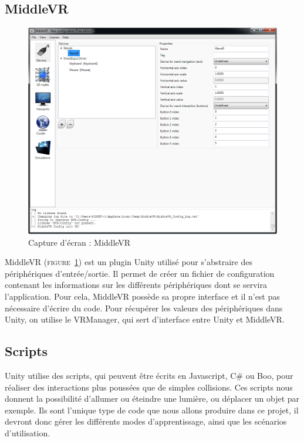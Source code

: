 \subsection{MiddleVR}
\begin{figure}[h]
  \includegraphics[width=1\textwidth]{4-Conception/img/middlevr_screenshot.png}
  \caption{Capture d'écran : MiddleVR}
  \label{middlevr}
\end{figure}
MiddleVR (\textsc{figure~\ref{middlevr}}) est un plugin Unity utilisé pour s'abstraire des périphériques d'entrée/sortie. Il permet de créer un fichier de configuration contenant les informations sur les différents périphériques dont se servira l'application. Pour cela, MiddleVR possède sa propre interface et il n'est pas nécessaire d'écrire du code.
Pour récupérer les valeurs des périphériques dans Unity, on utilise le VRManager, qui sert d'interface entre Unity et MiddleVR.

\subsection{Scripts}
Unity utilise des scripts, qui peuvent être écrits en Javascript, C\# ou Boo, pour réaliser des interactions plus poussées que de simples collisions. Ces scripts nous donnent la possibilité d'allumer ou éteindre une lumière, ou déplacer un objet par exemple. Ils sont l'unique type de code que nous allons produire dans ce projet, il devront donc gérer les différents modes d'apprentissage, ainsi que les scénarios d'utilisation.\newline

